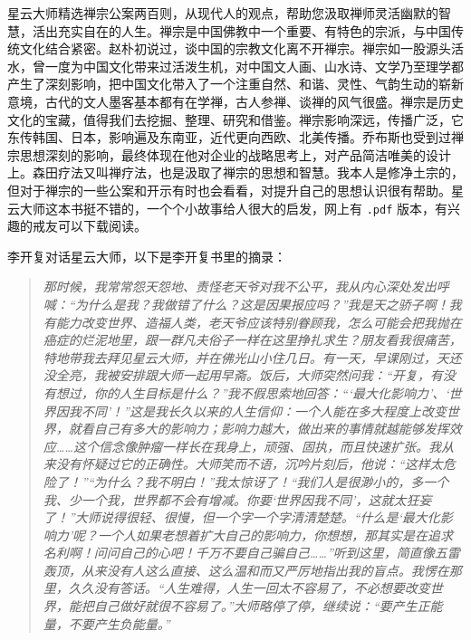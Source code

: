 \begin{book}
    星云大师精选禅宗公案两百则，从现代人的观点，帮助您汲取禅师灵活幽默的智慧，活出充实自在的人生。禅宗是中国佛教中一个重要、有特色的宗派，与中国传统文化结合紧密。赵朴初说过，谈中国的宗教文化离不开禅宗。禅宗如一股源头活水，曾一度为中国文化带来过活泼生机，对中国文人画、山水诗、文学乃至理学都产生了深刻影响，把中国文化带入了一个注重自然、和谐、灵性、气韵生动的崭新意境，古代的文人墨客基本都有在学禅，古人参禅、谈禅的风气很盛。禅宗是历史文化的宝藏，值得我们去挖掘、整理、研究和借鉴。禅宗影响深远，传播广泛，它东传韩国、日本，影响遍及东南亚，近代更向西欧、北美传播。乔布斯也受到过禅宗思想深刻的影响，最终体现在他对企业的战略思考上，对产品简洁唯美的设计上。森田疗法又叫禅疗法，也是汲取了禅宗的思想和智慧。我本人是修净土宗的，但对于禅宗的一些公案和开示有时也会看看，对提升自己的思想认识很有帮助。星云大师这本书挺不错的，一个个小故事给人很大的启发，网上有 \texttt{.pdf} 版本，有兴趣的戒友可以下载阅读。

    李开复对话星云大师，以下是李开复书里的摘录：

    \begin{quote}\it
        那时候，我常常怨天怨地、责怪老天爷对我不公平，我从内心深处发出呼喊：“为什么是我？我做错了什么？这是因果报应吗？”我是天之骄子啊！我有能力改变世界、造福人类，老天爷应该特别眷顾我，怎么可能会把我抛在癌症的烂泥地里，跟一群凡夫俗子一样在这里挣扎求生？朋友看我很痛苦，特地带我去拜见星云大师，并在佛光山小住几日。有一天，早课刚过，天还没全亮，我被安排跟大师一起用早斋。饭后，大师突然问我：“开复，有没有想过，你的人生目标是什么？”我不假思索地回答：“‘最大化影响力’、‘世界因我不同’！”这是我长久以来的人生信仰：一个人能在多大程度上改变世界，就看自己有多大的影响力；影响力越大，做出来的事情就越能够发挥效应……这个信念像肿瘤一样长在我身上，顽强、固执，而且快速扩张。我从来没有怀疑过它的正确性。大师笑而不语，沉吟片刻后，他说：“这样太危险了！”“为什么？我不明白！”我太惊讶了！“我们人是很渺小的，多一个我、少一个我，世界都不会有增减。你要‘世界因我不同’，这就太狂妄了！”大师说得很轻、很慢，但一个字一个字清清楚楚。“什么是‘最大化影响力’呢？一个人如果老想着扩大自己的影响力，你想想，那其实是在追求名利啊！问问自己的心吧！千万不要自己骗自己……”听到这里，简直像五雷轰顶，从来没有人这么直接、这么温和而又严厉地指出我的盲点。我愣在那里，久久没有答话。“人生难得，人生一回太不容易了，不必想要改变世界，能把自己做好就很不容易了。”大师略停了停，继续说：“要产生正能量，不要产生负能量。”
    \end{quote}
\end{book}
